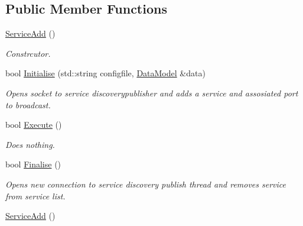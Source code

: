 \subsection*{Public Member Functions}
\begin{DoxyCompactItemize}
\item 
\hypertarget{classServiceAdd_a0148b0e038f4b0dd6f12c87cdf233f69}{\hyperlink{classServiceAdd_a0148b0e038f4b0dd6f12c87cdf233f69}{Service\-Add} ()}\label{classServiceAdd_a0148b0e038f4b0dd6f12c87cdf233f69}

\begin{DoxyCompactList}\small\item\em Constrcutor. \end{DoxyCompactList}\item 
\hypertarget{classServiceAdd_a047e44c3d209591703b0bdec1b1b51cd}{bool \hyperlink{classServiceAdd_a047e44c3d209591703b0bdec1b1b51cd}{Initialise} (std\-::string configfile, \hyperlink{classDataModel}{Data\-Model} \&data)}\label{classServiceAdd_a047e44c3d209591703b0bdec1b1b51cd}

\begin{DoxyCompactList}\small\item\em Opens socket to service discoverypublisher and adds a service and assosiated port to broadcast. \end{DoxyCompactList}\item 
\hypertarget{classServiceAdd_a4908df063074b02e73e589d9f07998ac}{bool \hyperlink{classServiceAdd_a4908df063074b02e73e589d9f07998ac}{Execute} ()}\label{classServiceAdd_a4908df063074b02e73e589d9f07998ac}

\begin{DoxyCompactList}\small\item\em Does nothing. \end{DoxyCompactList}\item 
\hypertarget{classServiceAdd_a2e4d3854bcd490935e6e9d39597c7204}{bool \hyperlink{classServiceAdd_a2e4d3854bcd490935e6e9d39597c7204}{Finalise} ()}\label{classServiceAdd_a2e4d3854bcd490935e6e9d39597c7204}

\begin{DoxyCompactList}\small\item\em Opens new connection to service discovery publish thread and removes service from service list. \end{DoxyCompactList}\item 
\hypertarget{classServiceAdd_a0148b0e038f4b0dd6f12c87cdf233f69}{\hyperlink{classServiceAdd_a0148b0e038f4b0dd6f12c87cdf233f69}{Service\-Add} ()}\label{classServiceAdd_a0148b0e038f4b0dd6f12c87cdf233f69}


\end{DoxyCompactItemize}

